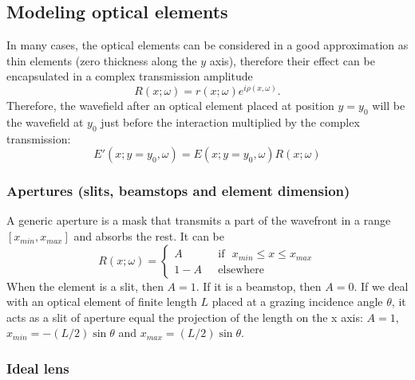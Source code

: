 \documentclass{iucr}              %
\begin{document}
\subsection{Modeling optical elements}
\label{sec:elements}

In many cases, the optical elements can be considered in a good approximation as thin elements (zero thickness along the $y$ axis), therefore their effect can be encapsulated in a complex transmission amplitude 
\begin{equation}
    \label{eq:thinelement}
    R(x;\omega)=r(x;\omega) e^{i \rho(x,\omega)}.
\end{equation}
Therefore, the wavefield after an optical element placed at position $y=y_0$ will be the wavefield at $y_0$ just before the interaction multiplied by the complex transmission:
\begin{equation}
    E'(x;y=y_0,\omega) = E(x;y=y_0,\omega) R(x;\omega)
\end{equation}


\subsubsection{Apertures (slits, beamstops and element dimension)}
\label{sec:aperture}

A generic aperture is a mask that transmits a part of the wavefront in a range $[x_{min},x_{max}]$ and absorbs the rest. It can be
\begin{equation}
R(x;\omega) =
\left\{
\begin{matrix}
A  & \mbox{~~if~~} x_{min} \le x \le x_{max}
\\ 
1 - A & \mbox{~~elsewhere}
\end{matrix}
\right.
\end{equation}
When the element is a slit, then $A=1$. If it is a beamstop, then $A=0$. If we deal with an optical element of finite length $L$ placed at a grazing incidence angle $\theta$, it acts as a slit of aperture equal the projection of the length on the x axis: $A=1$, $x_{min}=-(L/2) \sin \theta$ and $x_{max}=(L/2) \sin \theta$. 

\subsubsection{Ideal lens}
\label{sec:idealLens}
\end{document}
